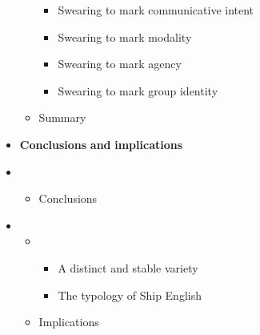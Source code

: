 \begin{itemize}
\begin{itemize}
\begin{itemize}
\item \begin{styleListParagraph}
Swearing to mark communicative intent
\end{styleListParagraph}
\item \begin{styleListParagraph}
Swearing to mark modality
\end{styleListParagraph}
\item \begin{styleListParagraph}
Swearing to mark agency
\end{styleListParagraph}
\item \begin{styleListParagraph}
Swearing to mark group identity 
\end{styleListParagraph}
\end{itemize}
\item \begin{styleListParagraph}
Summary 
\end{styleListParagraph}
\end{itemize}
\end{itemize}

\begin{itemize}
\item \begin{styleListParagraph}
\textbf{Conclusions} \textbf{and} \textbf{implications} 
\end{styleListParagraph}
\end{itemize}

\setcounter{itemize}{7}
\begin{itemize}
\item \begin{itemize}
\item \begin{styleListParagraph}
Conclusions 
\end{styleListParagraph}
\end{itemize}
\end{itemize}

\setcounter{itemize}{7}
\begin{itemize}
\item \begin{itemize}
\item \begin{itemize}
\item \begin{styleListParagraph}
A distinct and stable variety
\end{styleListParagraph}
\item \begin{styleListParagraph}
The typology of Ship English
\end{styleListParagraph}
\end{itemize}
\item \begin{styleListParagraph}
Implications 
\end{styleListParagraph}
\end{itemize}
\end{itemize}

